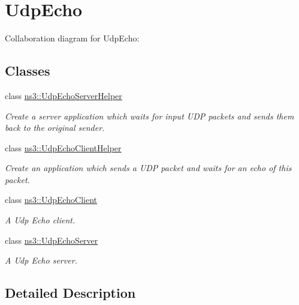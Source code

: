 \hypertarget{group__udpecho}{}\section{Udp\+Echo}
\label{group__udpecho}
Collaboration diagram for Udp\+Echo\+:
\subsection*{Classes}
\begin{DoxyCompactItemize}
\item 
class \hyperlink{classns3_1_1UdpEchoServerHelper}{ns3\+::\+Udp\+Echo\+Server\+Helper}
\begin{DoxyCompactList}\small\item\em Create a server application which waits for input U\+DP packets and sends them back to the original sender. \end{DoxyCompactList}\item 
class \hyperlink{classns3_1_1UdpEchoClientHelper}{ns3\+::\+Udp\+Echo\+Client\+Helper}
\begin{DoxyCompactList}\small\item\em Create an application which sends a U\+DP packet and waits for an echo of this packet. \end{DoxyCompactList}\item 
class \hyperlink{classns3_1_1UdpEchoClient}{ns3\+::\+Udp\+Echo\+Client}
\begin{DoxyCompactList}\small\item\em A Udp Echo client. \end{DoxyCompactList}\item 
class \hyperlink{classns3_1_1UdpEchoServer}{ns3\+::\+Udp\+Echo\+Server}
\begin{DoxyCompactList}\small\item\em A Udp Echo server. \end{DoxyCompactList}\end{DoxyCompactItemize}


\subsection{Detailed Description}
